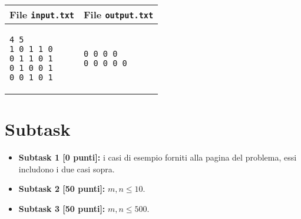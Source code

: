 \documentclass[a4paper,11pt]{article}
\begin{document}
    \noindent
    \begin{tabular}{p{11cm}|p{5cm}}
    \toprule
    \textbf{File \texttt{input.txt}}
    & \textbf{File \texttt{output.txt}}
    \\
    \midrule
    \scriptsize
    \begin{verbatim}
4 5
1 0 1 1 0
0 1 1 0 1
0 1 0 0 1
0 0 1 0 1
\end{verbatim}
    &
    \scriptsize
    \begin{verbatim}
0 0 0 0
0 0 0 0 0
\end{verbatim}
    \\
    \bottomrule
    \end{tabular}
  
\section*{Subtask}

  \begin{itemize}
    \item \textbf{Subtask 1 [0 punti]:} i casi di esempio forniti alla pagina del problema, essi includono i due casi sopra.
    
    \item \textbf{Subtask 2 [50 punti]:} $m,n \le 10$.
    \item \textbf{Subtask 3 [50 punti]:} $m,n \le 500$.
      
  \end{itemize}
  
\end{document}
